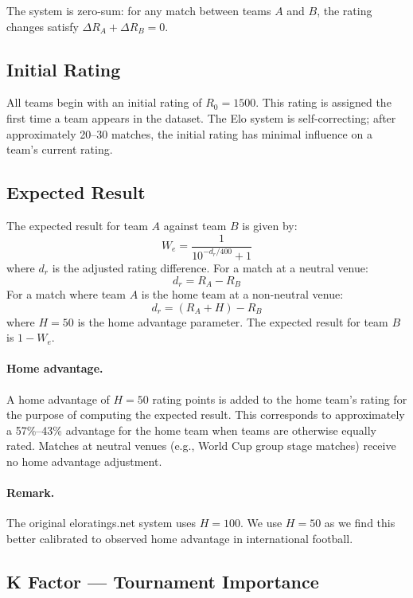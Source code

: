 \documentclass[11pt]{article}
\begin{document}
The system is zero-sum: for any match between teams $A$ and $B$, the rating changes satisfy $\Delta R_A + \Delta R_B = 0$.

\subsection{Initial Rating}

All teams begin with an initial rating of $R_0 = 1500$. This rating is assigned the first time a team appears in the dataset. The Elo system is self-correcting; after approximately 20--30 matches, the initial rating has minimal influence on a team's current rating.

\subsection{Expected Result}
\label{sec:expected}

The expected result for team $A$ against team $B$ is given by:
\begin{equation}
W_e = \frac{1}{10^{-d_r / 400} + 1}
\label{eq:expected}
\end{equation}
where $d_r$ is the adjusted rating difference. For a match at a neutral venue:
\[
d_r = R_A - R_B
\]
For a match where team $A$ is the home team at a non-neutral venue:
\[
d_r = (R_A + H) - R_B
\]
where $H = 50$ is the home advantage parameter. The expected result for team $B$ is $1 - W_e$.

\paragraph{Home advantage.} A home advantage of $H = 50$ rating points is added to the home team's rating for the purpose of computing the expected result. This corresponds to approximately a 57\%--43\% advantage for the home team when teams are otherwise equally rated. Matches at neutral venues (e.g., World Cup group stage matches) receive no home advantage adjustment.

\paragraph{Remark.} The original eloratings.net system uses $H = 100$. We use $H = 50$ as we find this better calibrated to observed home advantage in international football.

\subsection{K Factor --- Tournament Importance}
\label{sec:kfactor}
\end{document}
